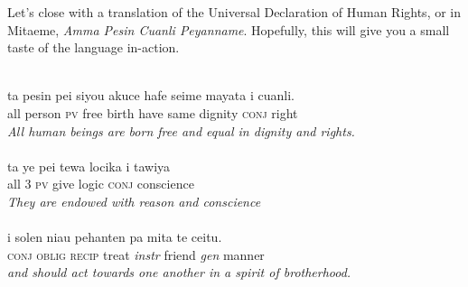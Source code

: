 \documentclass[a4paper, titlepage]{article}
\begin{document}
Let's close with a translation of the Universal Declaration of Human Rights, or in Mitaeme, \textit{Amma Pesin Cuanli Peyanname}.
Hopefully, this will give you a small taste of the language in-action.\\
\\
\hspace*{1cm}%
\begin{minipage}{.8\textwidth}%
ta pesin pei siyou akuce hafe seime mayata i cuanli.\\
all person \textsc{pv} free birth have same dignity \textsc{conj} right\\
\textit{All human beings are born free and equal in dignity and rights.}\\
\\
ta ye pei tewa locika i tawiya\\
all \textsc{3 pv} give logic \textsc{conj} conscience\\
\textit{They are endowed with reason and conscience}\\
\\
i solen niau pehanten pa mita te ceitu.\\
\textsc{conj oblig recip} treat \textit{instr} friend \textit{gen} manner\\
\textit{and should act towards one another in a spirit of brotherhood.}
\end{minipage}%
\end{document}
